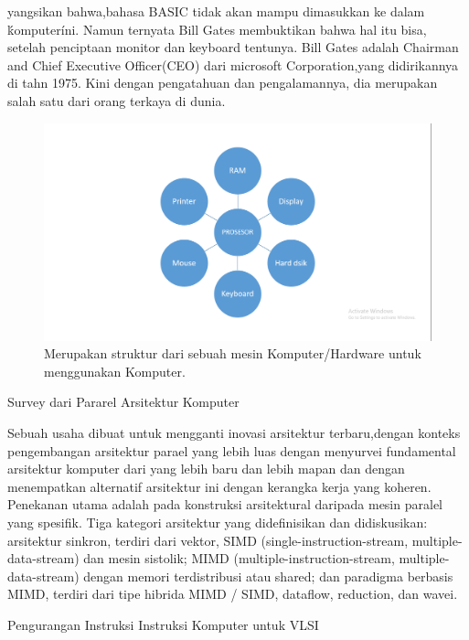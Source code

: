 yangsikan bahwa,bahasa BASIC tidak akan mampu dimasukkan ke dalam \'komputer\' ini. Namun ternyata Bill Gates membuktikan bahwa hal itu bisa, setelah penciptaan monitor dan keyboard tentunya. Bill Gates adalah Chairman and Chief Executive Officer(CEO) dari microsoft Corporation,yang didirikannya di tahn 1975.
Kini dengan pengatahuan dan pengalamannya, dia merupakan salah satu dari orang terkaya di dunia.\cite{syafrizal2005pengantar}
\begin{figure}[ht]
\centerline{\includegraphics[width=1\textwidth]{figures/komputer modern.PNG}}
\caption{Merupakan struktur dari sebuah mesin Komputer/Hardware untuk menggunakan Komputer.}
\label{komputer modern}
\end{figure}

Survey dari Pararel Arsitektur Komputer

	Sebuah usaha dibuat untuk mengganti inovasi arsitektur terbaru,dengan konteks pengembangan arsitektur parael yang lebih luas dengan menyurvei fundamental arsitektur komputer dari yang lebih baru dan lebih mapan dan dengan menempatkan alternatif arsitektur ini dengan kerangka kerja yang koheren.
Penekanan utama adalah pada konstruksi arsitektural daripada mesin paralel yang spesifik.
Tiga kategori arsitektur yang didefinisikan dan didiskusikan: arsitektur sinkron, terdiri dari vektor, SIMD (single-instruction-stream, multiple-data-stream) dan mesin sistolik; MIMD (multiple-instruction-stream, multiple-data-stream) dengan memori terdistribusi atau shared; dan paradigma berbasis MIMD, terdiri dari tipe hibrida MIMD / SIMD, dataflow, reduction, dan wavei.\cite{duncan1990survey}

Pengurangan Instruksi Instruksi Komputer untuk VLSI

